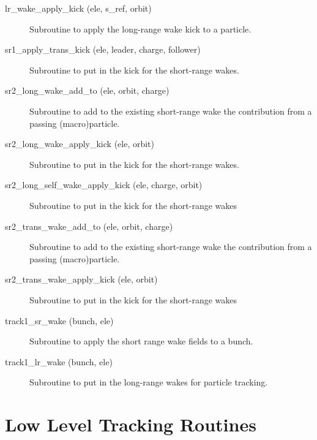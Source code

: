 \begin{description}

\item[lr\_wake\_apply\_kick (ele, s\_ref, orbit)] \Newline 
Subroutine to apply the long-range wake kick to a particle.

\item[sr1\_apply\_trans\_kick (ele, leader, charge, follower)] \Newline 
Subroutine to put in the kick for the short-range wakes.

\item[sr2\_long\_wake\_add\_to (ele, orbit, charge)] \Newline 
Subroutine to add to the existing short-range wake the contribution from
a passing (macro)particle.

\item[sr2\_long\_wake\_apply\_kick (ele, orbit)] \Newline 
Subroutine to put in the kick for the short-range wakes.

\item[sr2\_long\_self\_wake\_apply\_kick (ele, charge, orbit)] \Newline 
Subroutine to put in the kick for the short-range wakes

\item[sr2\_trans\_wake\_add\_to (ele, orbit, charge)] \Newline 
Subroutine to add to the existing short-range wake the contribution from
a passing (macro)particle.

\item[sr2\_trans\_wake\_apply\_kick (ele, orbit)] \Newline 
Subroutine to put in the kick for the short-range wakes

\item[track1\_sr\_wake (bunch, ele)] \Newline 
Subroutine to apply the short range wake fields to a bunch. 

\item[track1\_lr\_wake (bunch, ele)] \Newline 
Subroutine to put in the long-range wakes for particle tracking.

\end{description}

\section{Low Level Tracking Routines}
\label{r:low_track}

